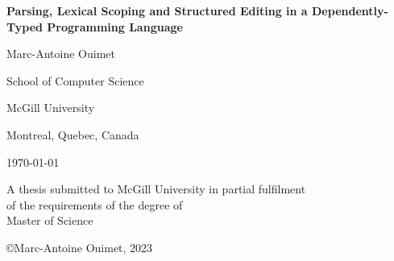 \begin{titlepage}
\centering

\vspace*{0.5cm}

{\bfseries\LARGE Parsing, Lexical Scoping and Structured Editing in a Dependently-Typed Programming Language}

\vspace{1.8cm}

{\large Marc-Antoine Ouimet}

\vspace{2cm}

School of Computer Science

McGill University

Montreal, Quebec, Canada

\vspace{1.5cm}

\monthyeardate\today

\vspace{2cm}

A thesis submitted to McGill University in partial fulfilment\\
of the requirements of the degree of\\
Master of Science

\vfill

\copyright Marc-Antoine Ouimet, 2023
\end{titlepage}
